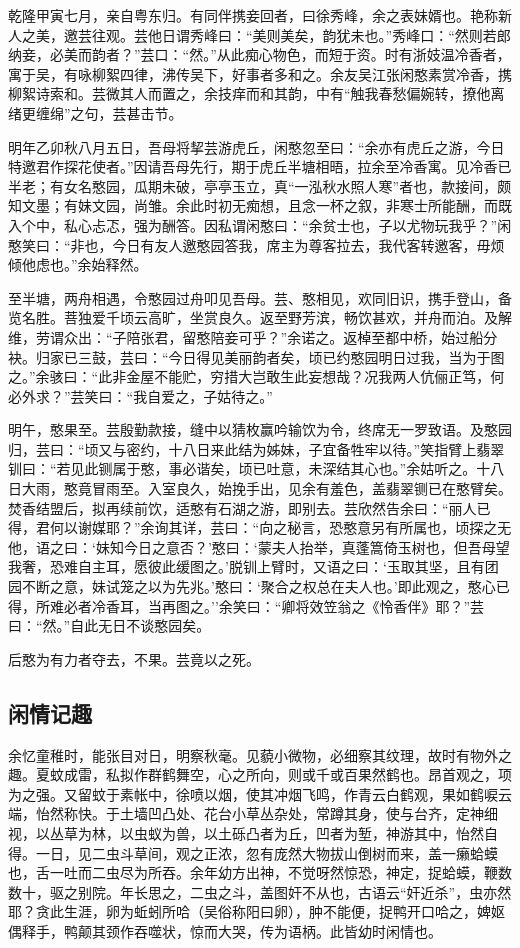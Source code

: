 \documentclass[]{article}
\begin{document}
乾隆甲寅七月，亲自粤东归。有同伴携妾回者，曰徐秀峰，余之表妹婿也。艳称新人之美，邀芸往观。芸他日谓秀峰曰：``美则美矣，韵犹未也。''秀峰口：``然则若郎纳妾，必美而韵者？''芸口：``然。''从此痴心物色，而短于资。时有浙妓温冷香者，寓于吴，有咏柳絮四律，沸传吴下，好事者多和之。余友吴江张闲憨素赏冷香，携柳絮诗索和。芸微其人而置之，余技痒而和其韵，中有``触我春愁偏婉转，撩他离绪更缠绵''之句，芸甚击节。

明年乙卯秋八月五日，吾母将挈芸游虎丘，闲憨忽至曰：``余亦有虎丘之游，今日特邀君作探花使者。''因请吾母先行，期于虎丘半塘相晤，拉余至冷香寓。见冷香已半老；有女名憨园，瓜期未破，亭亭玉立，真``一泓秋水照人寒''者也，款接间，颇知文墨；有妹文园，尚雏。余此时初无痴想，且念一杯之叙，非寒士所能酬，而既入个中，私心忐忑，强为酬答。因私谓闲憨曰：``余贫士也，子以尤物玩我乎？''闲憨笑曰：``非也，今日有友人邀憨园答我，席主为尊客拉去，我代客转邀客，毋烦倾他虑也。''余始释然。

至半塘，两舟相遇，令憨园过舟叩见吾母。芸、憨相见，欢同旧识，携手登山，备览名胜。菩独爱千顷云高旷，坐赏良久。返至野芳滨，畅饮甚欢，并舟而泊。及解维，劳谓众出：``子陪张君，留憨陪妾可乎？''余诺之。返棹至都中桥，始过船分袂。归家已三鼓，芸曰：``今日得见美丽韵者矣，顷已约憨园明日过我，当为于图之。''余骇曰：``此非金屋不能贮，穷措大岂敢生此妄想哉？况我两人伉俪正笃，何必外求？''芸笑曰：``我自爱之，子姑待之。''

明午，憨果至。芸殷勤款接，缝中以猜枚赢吟输饮为令，终席无一罗致语。及憨园归，芸曰：``顷又与密约，十八日来此结为姊妹，子宜备牲牢以待。''笑指臂上翡翠钏曰：``若见此铡属于憨，事必谐矣，顷已吐意，未深结其心也。''余姑听之。十八日大雨，憨竟冒雨至。入室良久，始挽手出，见余有羞色，盖翡翠铡已在憨臂矣。焚香结盟后，拟再续前饮，适憨有石湖之游，即别去。芸欣然告余曰：``丽人已得，君何以谢媒耶？''余询其详，芸曰：``向之秘言，恐憨意另有所属也，顷探之无他，语之曰：`妹知今日之意否？'憨曰：`蒙夫人抬举，真蓬篙倚玉树也，但吾母望我奢，恐难自主耳，愿彼此缓图之。'脱钏上臂时，又语之曰：`玉取其坚，且有团园不断之意，妹试笼之以为先兆。'憨曰：`聚合之权总在夫人也。'即此观之，憨心已得，所难必者冷香耳，当再图之。''余笑曰：``卿将效笠翁之《怜香伴》耶？''芸曰：``然。''自此无日不谈憨园矣。

后憨为有力者夺去，不果。芸竟以之死。

\hypertarget{header-n19}{%
\subsection{闲情记趣}\label{header-n19}}

余忆童稚时，能张目对日，明察秋毫。见藐小微物，必细察其纹理，故时有物外之趣。夏蚊成雷，私拟作群鹤舞空，心之所向，则或千或百果然鹤也。昂首观之，项为之强。又留蚊于素帐中，徐喷以烟，使其冲烟飞鸣，作青云白鹤观，果如鹤唳云端，怡然称快。于土墙凹凸处、花台小草丛杂处，常蹲其身，使与台齐，定神细视，以丛草为林，以虫蚁为兽，以土砾凸者为丘，凹者为堑，神游其中，怡然自得。一日，见二虫斗草间，观之正浓，忽有庞然大物拔山倒树而来，盖一癞蛤蟆也，舌一吐而二虫尽为所吞。余年幼方出神，不觉呀然惊恐，神定，捉蛤蟆，鞭数数十，驱之别院。年长思之，二虫之斗，盖图奸不从也，古语云``奸近杀''，虫亦然耶？贪此生涯，卵为蚯蚓所哈（吴俗称阳曰卵），肿不能便，捉鸭开口哈之，婢妪偶释手，鸭颠其颈作吞噬状，惊而大哭，传为语柄。此皆幼时闲情也。
\end{document}
